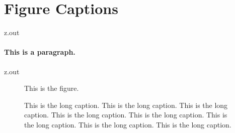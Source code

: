 \section{Figure Captions}


\begin{VerbatimOut}{z.out}

\paragraph{This is a paragraph.}
\end{VerbatimOut}

\MyIO


\begin{VerbatimOut}{z.out}

\begin{figure}[h]
  \centering
    This is the figure.
  \caption[A short caption for the list of figures.]{%
    This is the long caption.  This is the long caption.
    This is the long caption.  This is the long caption.
    This is the long caption.  This is the long caption.
    This is the long caption.  This is the long caption.%
  }
\end{figure}
\end{VerbatimOut}

\MyIO
